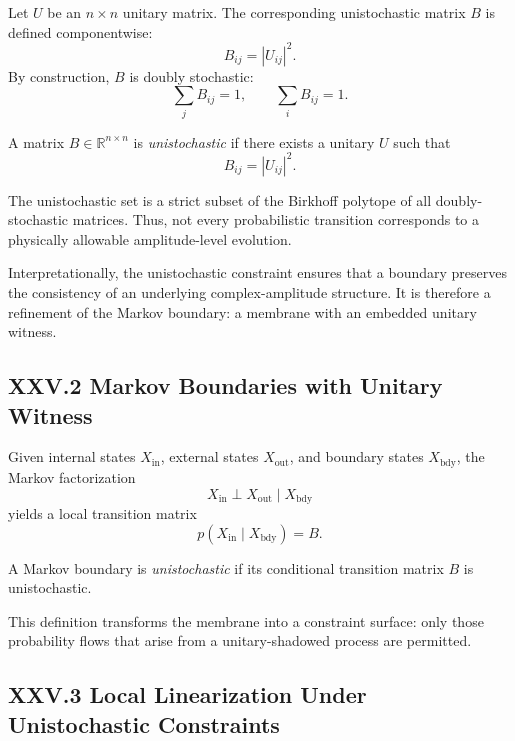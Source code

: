 \documentclass[11pt,letterpaper]{article}
\begin{document}
Let $U$ be an $n \times n$ unitary matrix. The corresponding unistochastic matrix $B$ is defined componentwise:
\[
B_{ij} = |U_{ij}|^2.
\]
By construction, $B$ is doubly stochastic:
\[
\sum_j B_{ij} = 1, \qquad \sum_i B_{ij} = 1.
\]

\begin{definition}
A matrix $B \in \mathbb{R}^{n \times n}$ is \emph{unistochastic} if there exists a unitary $U$ such that  
\[
B_{ij} = |U_{ij}|^2.
\]
\end{definition}

The unistochastic set is a strict subset of the Birkhoff polytope of all doubly-stochastic matrices. Thus, not every probabilistic transition corresponds to a physically allowable amplitude-level evolution.

Interpretationally, the unistochastic constraint ensures that a boundary preserves the consistency of an underlying complex-amplitude structure. It is therefore a refinement of the Markov boundary: a membrane with an embedded unitary witness.

\subsection{XXV.2 Markov Boundaries with Unitary Witness}

Given internal states $X_{\text{in}}$, external states $X_{\text{out}}$, and boundary states $X_{\text{bdy}}$, the Markov factorization
\[
X_{\text{in}} \perp X_{\text{out}} \mid X_{\text{bdy}}
\]
yields a local transition matrix  
\[
p(X_{\text{in}} \mid X_{\text{bdy}}) = B.
\]

\begin{definition}
A Markov boundary is \emph{unistochastic} if its conditional transition matrix $B$ is unistochastic.
\end{definition}

This definition transforms the membrane into a constraint surface: only those probability flows that arise from a unitary-shadowed process are permitted.

\subsection{XXV.3 Local Linearization Under Unistochastic Constraints}
\end{document}
